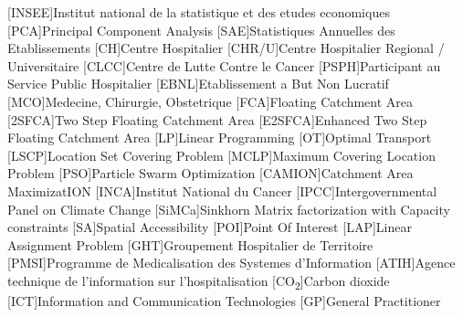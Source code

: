 \begin{multicols}{2}

\begin{acronym}
        [INSEE]{Institut national de la statistique et des etudes economiques}
        [PCA]{Principal Component Analysis}
        [SAE]{Statistiques Annuelles des Etablissements}
        [CH]{Centre Hospitalier}
        [CHR/U]{Centre Hospitalier Regional / Universitaire}
        [CLCC]{Centre de Lutte Contre le Cancer}
        [PSPH]{Participant au Service Public Hospitalier }
        [EBNL]{Etablissement a But Non Lucratif}
        [MCO]{Medecine, Chirurgie, Obstetrique}
        [FCA]{Floating Catchment Area}
        [2SFCA]{Two Step Floating Catchment Area}
        [E2SFCA]{Enhanced Two Step Floating Catchment Area}
        [LP]{Linear Programming}
        [OT]{Optimal Transport}
        [LSCP]{Location Set Covering Problem}
        [MCLP]{Maximum Covering Location Problem}
        [PSO]{Particle Swarm Optimization}
        [CAMION]{Catchment Area MaximizatION}
        [INCA]{Institut National du Cancer}
        [IPCC]{Intergovernmental Panel on Climate Change}
        [SiMCa]{Sinkhorn Matrix factorization with Capacity constraints}
        [SA]{Spatial Accessibility}
        [POI]{Point Of Interest}
        [LAP]{Linear Assignment Problem}
        [GHT]{Groupement Hospitalier de Territoire}
        [PMSI]{Programme de Medicalisation des Systemes d'Information}
        [ATIH]{Agence technique de l'information sur l'hospitalisation}
        [CO\textsubscript{2}]{Carbon dioxide}
        [ICT]{Information and Communication Technologies}
        [GP]{General Practitioner}

\end{acronym}

\end{multicols}

